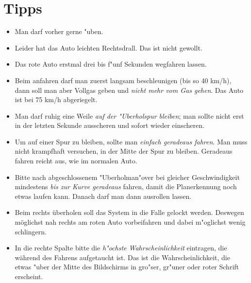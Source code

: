 \documentclass[a4paper,12pt]{scrartcl}
\begin{document}
\section*{Tipps}
\begin{itemize}
\item Man darf vorher gerne "uben.
\item Leider hat das Auto leichten Rechtsdrall. Das ist nicht gewollt.
\item Das rote Auto erstmal drei bis f"unf Sekunden wegfahren lassen.
\item Beim anfahren darf man zuerst langsam beschleunigen (bis so
    40 km/h), dann soll man aber Vollgas geben und {\em nicht mehr vom
    Gas gehen}.
    Das Auto ist bei 75 km/h abgeriegelt.
\item Man darf ruhig eine Weile {\em auf der "Uberholspur bleiben};
    man sollte nicht erst in der letzten Sekunde ausscheren
    und sofort wieder einscheren.
\item Um auf einer Spur zu bleiben, sollte man {\em einfach geradeaus
    fahren}. Man muss nicht krampfhaft versuchen, in der Mitte
    der Spur zu bleiben. Geradeaus fahren reicht aus,
    wie im normalen Auto.
\item Bitte nach abgeschlossenem "Uberholman"over bei gleicher
    Geschwindigkeit mindestens {\em bis zur Kurve geradeaus} fahren,
    damit die Planerkennung noch etwas laufen kann.
    Danach darf man dann ausrollen lassen.
\item Beim rechts \"uberholen soll das System in die Falle gelockt
    werden. Deswegen m\"oglichst nah rechts am roten Auto
    vorbeifahren und dabei m"oglichst wenig schlingern.
\item In die rechte Spalte bitte die {\em h"ochste Wahrscheinlichkeit}
    eintragen, die w\"ahrend des Fahrens aufgetaucht ist.
    Das ist die Wahrscheinlichkeit, die etwas "uber der Mitte des
    Bildschirms in gro"ser, gr"uner oder roter Schrift erscheint.
\end{itemize}
\end{document}
